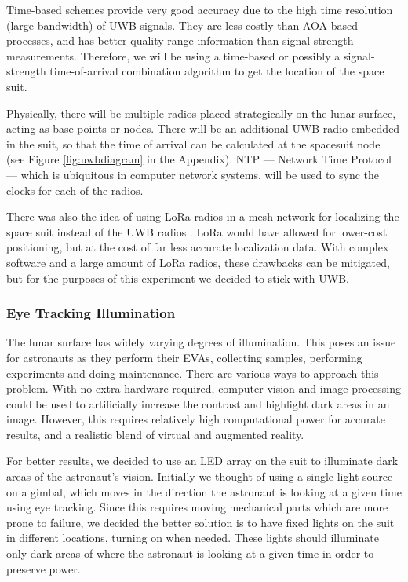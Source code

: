 \documentclass{article}
\let\Oldsubsubsection\subsubsection
\renewcommand{\subsubsection}{\FloatBarrier\Oldsubsubsection}
\begin{document}
Time-based schemes provide very good accuracy due to the high time resolution (large bandwidth) of UWB signals. They are less costly than AOA-based processes, and has better quality range information than signal strength measurements. Therefore, we will be using a time-based or possibly a signal-strength time-of-arrival combination algorithm to get the location of the space suit.

Physically, there will be multiple radios placed strategically on the lunar surface, acting as base points or nodes. There will be an additional UWB radio embedded in the suit, so that the time of arrival can be calculated at the spacesuit node (see Figure \ref{fig:uwbdiagram} in the Appendix). NTP --- Network Time Protocol --- which is ubiquitous in computer network systems, will be used to sync the clocks for each of the radios.

There was also the idea of using LoRa radios in a mesh network for localizing the space suit instead of the UWB radios \autocite{lorapositioning}. LoRa would have allowed for lower-cost positioning, but at the cost of far less accurate localization data. With complex software and a large amount of LoRa radios, these drawbacks can be mitigated, but for the purposes of this experiment we decided to stick with UWB.

\subsubsection{Eye Tracking Illumination}

The lunar surface has widely varying degrees of illumination. This poses an issue for astronauts as they perform their EVAs, collecting samples, performing experiments and doing maintenance. There are various ways to approach this problem. With no extra hardware required, computer vision and image processing could be used to artificially increase the contrast and highlight dark areas in an image. However, this requires relatively high computational power for accurate results, and a realistic blend of virtual and augmented reality.

For better results, we decided to use an LED array on the suit to illuminate dark areas of the astronaut's vision. Initially we thought of using a single light source on a gimbal, which moves in the direction the astronaut is looking at a given time using eye tracking. Since this requires moving mechanical parts which are more prone to failure, we decided the better solution is to have fixed lights on the suit in different locations, turning on when needed. These lights should illuminate only dark areas of where the astronaut is looking at a given time in order to preserve power. 
\end{document}
